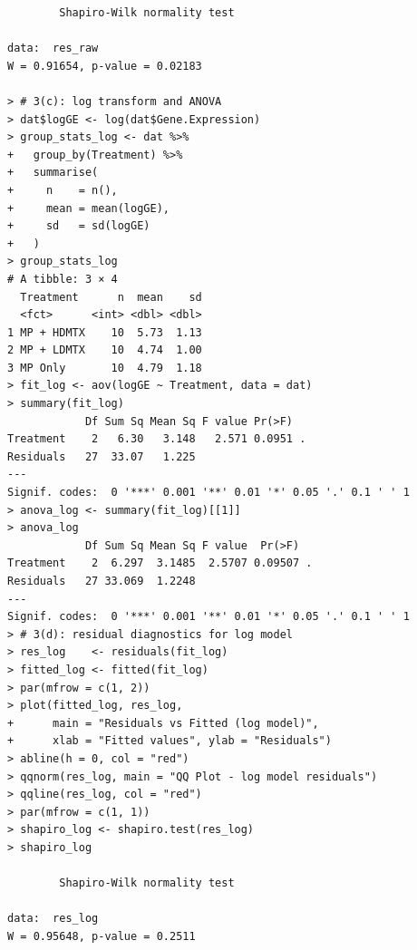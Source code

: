 \documentclass[answers,12pt,addpoints]{exam}
\begin{document}
\begin{verbatim}
        Shapiro-Wilk normality test

data:  res_raw
W = 0.91654, p-value = 0.02183

> # 3(c): log transform and ANOVA
> dat$logGE <- log(dat$Gene.Expression)
> group_stats_log <- dat %>%
+   group_by(Treatment) %>%
+   summarise(
+     n    = n(),
+     mean = mean(logGE),
+     sd   = sd(logGE)
+   )
> group_stats_log
# A tibble: 3 × 4
  Treatment      n  mean    sd
  <fct>      <int> <dbl> <dbl>
1 MP + HDMTX    10  5.73  1.13
2 MP + LDMTX    10  4.74  1.00
3 MP Only       10  4.79  1.18
> fit_log <- aov(logGE ~ Treatment, data = dat)
> summary(fit_log)
            Df Sum Sq Mean Sq F value Pr(>F)
Treatment    2   6.30   3.148   2.571 0.0951 .
Residuals   27  33.07   1.225
---
Signif. codes:  0 '***' 0.001 '**' 0.01 '*' 0.05 '.' 0.1 ' ' 1
> anova_log <- summary(fit_log)[[1]]
> anova_log
            Df Sum Sq Mean Sq F value  Pr(>F)
Treatment    2  6.297  3.1485  2.5707 0.09507 .
Residuals   27 33.069  1.2248
---
Signif. codes:  0 '***' 0.001 '**' 0.01 '*' 0.05 '.' 0.1 ' ' 1
> # 3(d): residual diagnostics for log model
> res_log    <- residuals(fit_log)
> fitted_log <- fitted(fit_log)
> par(mfrow = c(1, 2))
> plot(fitted_log, res_log,
+      main = "Residuals vs Fitted (log model)",
+      xlab = "Fitted values", ylab = "Residuals")
> abline(h = 0, col = "red")
> qqnorm(res_log, main = "QQ Plot - log model residuals")
> qqline(res_log, col = "red")
> par(mfrow = c(1, 1))
> shapiro_log <- shapiro.test(res_log)
> shapiro_log

        Shapiro-Wilk normality test

data:  res_log
W = 0.95648, p-value = 0.2511
\end{verbatim}
\end{document}
